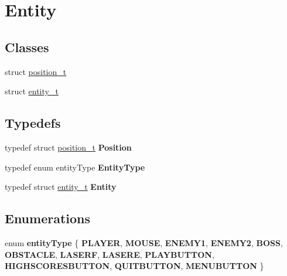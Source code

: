 \hypertarget{group__Entity}{}\section{Entity}
\label{group__Entity}
\subsection*{Classes}
\begin{DoxyCompactItemize}
\item 
struct \hyperlink{structposition__t}{position\+\_\+t}
\item 
struct \hyperlink{structentity__t}{entity\+\_\+t}
\end{DoxyCompactItemize}
\subsection*{Typedefs}
\begin{DoxyCompactItemize}
\item 
\mbox{\label{group__Entity_ga5ce99a044d0f8b560d9ad33c7d017d1b}} 
typedef struct \hyperlink{structposition__t}{position\+\_\+t} {\bfseries Position}
\item 
\mbox{\label{group__Entity_ga47e3be68ab09601ff1e54a5ee182e101}} 
typedef enum entity\+Type {\bfseries Entity\+Type}
\item 
\mbox{\label{group__Entity_ga3c7a6238d50c1af83f91fd0fa458f260}} 
typedef struct \hyperlink{structentity__t}{entity\+\_\+t} {\bfseries Entity}
\end{DoxyCompactItemize}
\subsection*{Enumerations}
\begin{DoxyCompactItemize}
\item 
\mbox{\label{group__Entity_gac25bae40f86dbaf62807318d4042d75c}} 
enum {\bfseries entity\+Type} \{ \newline
{\bfseries P\+L\+A\+Y\+ER}, 
{\bfseries M\+O\+U\+SE}, 
{\bfseries E\+N\+E\+M\+Y1}, 
{\bfseries E\+N\+E\+M\+Y2}, 
\newline
{\bfseries B\+O\+SS}, 
{\bfseries O\+B\+S\+T\+A\+C\+LE}, 
{\bfseries L\+A\+S\+E\+RF}, 
{\bfseries L\+A\+S\+E\+RE}, 
\newline
{\bfseries P\+L\+A\+Y\+B\+U\+T\+T\+ON}, 
{\bfseries H\+I\+G\+H\+S\+C\+O\+R\+E\+S\+B\+U\+T\+T\+ON}, 
{\bfseries Q\+U\+I\+T\+B\+U\+T\+T\+ON}, 
{\bfseries M\+E\+N\+U\+B\+U\+T\+T\+ON}
 \}
\end{DoxyCompactItemize}
